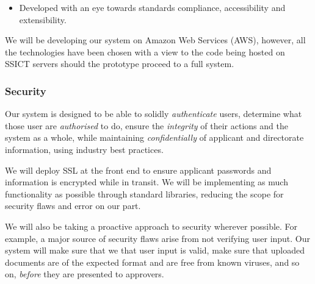 \documentclass[12pt,a4paper,twosided]{article}
\begin{document}
\begin{itemize}
  \begin{itemize}
  \itemsep1pt\parskip0pt
  \item
    Developed with an eye towards standards compliance, accessibility
    and extensibility.
  \end{itemize}
\end{itemize}

We will be developing our system on Amazon Web Services (AWS), however,
all the technologies have been chosen with a view to the code being
hosted on SSICT servers should the prototype proceed to a full system.

\subsubsection{Security}

Our system is designed to be able to solidly \emph{authenticate} users,
determine what those user are \emph{authorised} to do, ensure the
\emph{integrity} of their actions and the system as a whole, while
maintaining \emph{confidentially} of applicant and directorate
information, using industry best practices.

We will deploy SSL at the front end to ensure applicant passwords and
information is encrypted while in transit. We will be implementing as
much functionality as possible through standard libraries, reducing the
scope for security flaws and error on our part.

We will also be taking a proactive approach to security wherever
possible. For example, a major source of security flaws arise from not
verifying user input. Our system will make sure that we that user input
is valid, make sure that uploaded documents are of the expected format
and are free from known viruses, and so on, \emph{before} they are
presented to approvers.
\end{document}
